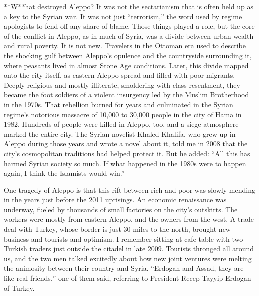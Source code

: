 **W**hat destroyed Aleppo? It was not the sectarianism that is often
held up as a key to the Syrian war. It was not just ``terrorism,'' the
word used by regime apologists to fend off any share of blame. Those
things played a role, but the core of the conflict in Aleppo, as in much
of Syria, was a divide between urban wealth and rural poverty. It is not
new. Travelers in the Ottoman era used to describe the shocking gulf
between Aleppo's opulence and the countryside surrounding it, where
peasants lived in almost Stone Age conditions. Later, this divide mapped
onto the city itself, as eastern Aleppo spread and filled with poor
migrants. Deeply religious and mostly illiterate, smoldering with class
resentment, they became the foot soldiers of a violent insurgency led by
the Muslim Brotherhood in the 1970s. That rebellion burned for years and
culminated in the Syrian regime's notorious massacre of 10,000 to 30,000
people in the city of Hama in 1982. Hundreds of people were killed in
Aleppo, too, and a siege atmosphere marked the entire city. The Syrian
novelist Khaled Khalifa, who grew up in Aleppo during those years and
wrote a novel about it, told me in 2008 that the city's cosmopolitan
traditions had helped protect it. But he added: ``All this has harmed
Syrian society so much. If what happened in the 1980s were to happen
again, I think the Islamists would win.''

One tragedy of Aleppo is that this rift between rich and poor was slowly
mending in the years just before the 2011 uprisings. An economic
renaissance was underway, fueled by thousands of small factories on the
city's outskirts. The workers were mostly from eastern Aleppo, and the
owners from the west. A trade deal with Turkey, whose border is just 30
miles to the north, brought new business and tourists and optimism. I
remember sitting at cafe table with two Turkish traders just outside the
citadel in late 2009. Tourists thronged all around us, and the two men
talked excitedly about how new joint ventures were melting the animosity
between their country and Syria. ``Erdogan and Assad, they are like real
friends,'' one of them said, referring to President Recep Tayyip Erdogan
of Turkey.

